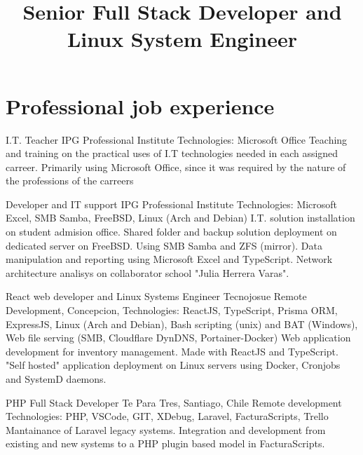 \documentclass[draft,color,12pt,letterpaper,sans]{moderncv}
\title{Senior Full Stack Developer and Linux System Engineer}
\begin{document}
\makecvtitle %

\section{Professional job experience}

{I.T. Teacher}
{IPG Professional Institute}
{}
{\newline Technologies: Microsoft Office}
{Teaching and training on the practical uses of I.T technologies needed in each assigned carreer. Primarily using Microsoft Office, since it was required by the nature of the professions of the carreers \newline}

{Developer and IT support}
{IPG Professional Institute}
{}
{\newline Technologies: Microsoft Excel, SMB Samba, FreeBSD, Linux (Arch and Debian)}
{I.T. solution installation on student admision office. \newline Shared folder and backup solution deployment on dedicated server on FreeBSD. Using SMB Samba and ZFS (mirror). \newline Data manipulation and reporting using Microsoft Excel and TypeScript. \newline Network architecture analisys on collaborator school "Julia Herrera Varas". \newline}

{React web developer and Linux Systems Engineer}
{Tecnojosue}
{\newline Remote Development, Concepcion, }
{\newline Technologies: ReactJS, TypeScript, Prisma ORM, ExpressJS, Linux (Arch and Debian), Bash scripting (unix) and BAT (Windows), Web file serving (SMB, Cloudflare DynDNS, Portainer-Docker)}
{Web application development for inventory management. Made with ReactJS and TypeScript. \newline "Self hosted" application deployment on Linux servers using Docker, Cronjobs and SystemD daemons. \newline}

{PHP Full Stack Developer}
{Te Para Tres, Santiago, Chile}
{\newline Remote development}
{\newline Technologies: PHP, VSCode, GIT, XDebug, Laravel, FacturaScripts, Trello}
{Mantainance of Laravel legacy systems. Integration and development from existing and new systems to a PHP plugin based model in FacturaScripts.\newline}
\end{document}
